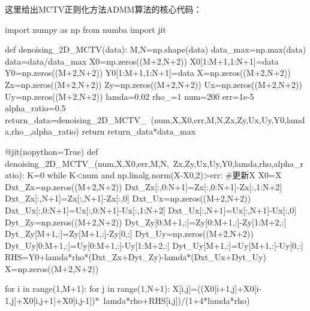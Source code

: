 \documentclass[12pt]{article}
\begin{document}
\par
这里给出MCTV正则化方法ADMM算法的核心代码：
\begin{python}
import numpy as np
from numba import jit

def denoising_2D_MCTV(data):
    M,N=np.shape(data)
    data_max=np.max(data)
    data=data/data_max
    X0=np.zeros((M+2,N+2))
    X0[1:M+1,1:N+1]=data
    Y0=np.zeros((M+2,N+2))
    Y0[1:M+1,1:N+1]=data
    X=np.zeros((M+2,N+2))
    Zx=np.zeros((M+2,N+2))
    Zy=np.zeros((M+2,N+2))
    Ux=np.zeros((M+2,N+2))
    Uy=np.zeros((M+2,N+2))
    lamda=0.02
    rho_=1
    num=200
    err=1e-5
    alpha_ratio=0.5
    return_data=denoising_2D_MCTV_\
    (num,X,X0,err,M,N,Zx,Zy,Ux,Uy,Y0,lamda,rho_,alpha_ratio)
    return return_data*data_max

@jit(nopython=True)
def denoising_2D_MCTV_(num,X,X0,err,M,N,\
                       Zx,Zy,Ux,Uy,Y0,lamda,rho,alpha_ratio):
    K=0
    while K<num and np.linalg.norm(X-X0,2)>err:
        #更新X
        X0=X
        Dxt_Zx=np.zeros((M+2,N+2))
        Dxt_Zx[:,0:N+1]=Zx[:,0:N+1]-Zx[:,1:N+2]
        Dxt_Zx[:,N+1]=Zx[:,N+1]-Zx[:,0]
        Dxt_Ux=np.zeros((M+2,N+2))
        Dxt_Ux[:,0:N+1]=Ux[:,0:N+1]-Ux[:,1:N+2]
        Dxt_Ux[:,N+1]=Ux[:,N+1]-Ux[:,0]    
        Dyt_Zy=np.zeros((M+2,N+2))
        Dyt_Zy[0:M+1,:]=Zy[0:M+1,:]-Zy[1:M+2,:]
        Dyt_Zy[M+1,:]=Zy[M+1,:]-Zy[0,:]
        Dyt_Uy=np.zeros((M+2,N+2))
        Dyt_Uy[0:M+1,:]=Uy[0:M+1,:]-Uy[1:M+2,:]
        Dyt_Uy[M+1,:]=Uy[M+1,:]-Uy[0,:]
        RHS=Y0+lamda*rho*(Dxt_Zx+Dyt_Zy)-lamda*(Dxt_Ux+Dyt_Uy)
        X=np.zeros((M+2,N+2))
        
        for i in range(1,M+1):
            for j in range(1,N+1):
                X[i,j]=((X0[i+1,j]+X0[i-1,j]+X0[i,j+1]+X0[i,j-1])*\
                lamda*rho+RHS[i,j])/(1+4*lamda*rho)
                

\end{python}
\end{document}
